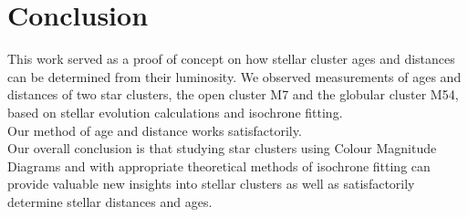 \documentclass[12pt, twocolumn]{aastex62}
\begin{document}
	\section{Conclusion}
	This work served as a proof of concept on how stellar cluster ages and distances can be determined from their luminosity. We observed measurements of ages and distances of two star clusters, the open cluster M7 and the globular cluster M54, based on stellar evolution calculations and isochrone fitting.\\
	Our method of age and distance works satisfactorily.\\
	Our overall conclusion is that studying star clusters using Colour Magnitude Diagrams and with appropriate theoretical methods of isochrone fitting can provide valuable new insights into stellar clusters as well as satisfactorily determine stellar distances and ages.
\end{document}
